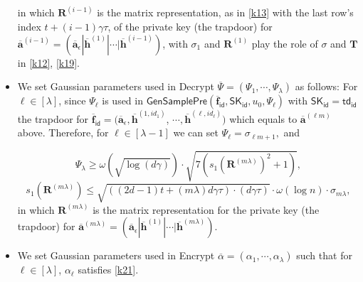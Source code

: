 \documentclass[runningheads]{llncs}
\begin{document}
\begin{itemize}
 
 	in which $\mathbf{R}^{(i-1)}$ is the matrix representation, as in \eqref{k13} with the last row's index  $t+(i-1)\gamma\tau$, of the private key (the trapdoor) for $\overline{\mathbf{a}}^{(i-1)}=(\overline{\mathbf{a}}_{\epsilon}|\overline{\mathbf{h}}^{(1)}|\cdots| \overline{\mathbf{h}}^{(i-1)})$, with  $\sigma_1$ and $\mathbf{R}^{(1)}$ play the role of $\sigma$ and $\mathbf{T}$ in \eqref{k12}, \eqref{k19}.
 
 		\item  We set Gaussian parameters used in \textsf{Decrypt} $\overline{\Psi}=(\Psi_1,\cdots , \Psi_\lambda)$ as follows: For $\ell \in [\lambda]$, since  $\Psi_\ell$ is used in  $\mathsf{GenSamplePre}(\overline{\textbf{f}}_{\mathsf{id}}, \mathsf{SK}_\mathsf{id}, u_0,\Psi_\ell)$ with $\mathsf{SK}_\mathsf{id}=\textsf{td}_\textsf{id}$ the trapdoor for $\overline{\mathbf{f}}_{\mathsf{id}}=(\overline{\mathbf{a}}_{\epsilon}, \overline{\mathbf{h}}^{(1,id_1)}$, $  \cdots,\overline{\mathbf{h}}^{(\ell,id_{\ell})})$ which equals to $\overline{\mathbf{a}}^{(\ell m)}$ above. Therefore, for $\ell \in [\lambda-1]$ we can set
 	$\Psi_\ell =\sigma_{\ell m+1},$ and 
 	 	
 	 	\begin{equation*}\label{k36}
 	 	 	\Psi_\lambda \geq \omega(\sqrt{\log (d\gamma)})\cdot \sqrt{7(s_1(\mathbf{R}^{(m \lambda)})^2+1)}, 
 	 	 	\end{equation*}
 	 	 	 \begin{equation*}\label{k37}
 	 	 	s_1(\mathbf{R}^{(m \lambda)}) \leq \sqrt{((2d-1)t+(m \lambda)d\gamma \tau)\cdot (d\gamma \tau)}\cdot \omega(\log n)\cdot \sigma_{m \lambda},
 	 	 	\end{equation*}
 in which $\mathbf{R}^{(m \lambda)}$ is the matrix representation for the private key (the trapdoor) for $\overline{\mathbf{a}}^{(m \lambda)}=(\overline{\mathbf{a}}_{\epsilon}|\overline{\mathbf{h}}^{(1)}|\cdots| \overline{\mathbf{h}}^{(m \lambda)})$.
 		\item We set Gaussian parameters used in \textsf{Encrypt} $\overline{\alpha}=(\alpha_1,\cdots , \alpha_\lambda)$ such that for $\ell \in [\lambda]$, $\alpha_{\ell}$ satisfies \eqref{k21}.
 \end{itemize}

  
\end{document}
